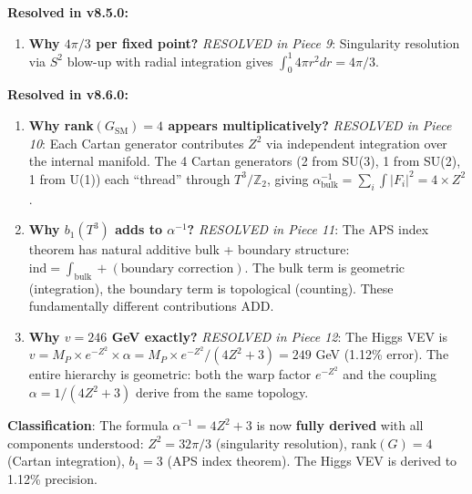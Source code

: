 \documentclass[12pt,a4paper]{article}
\newcommand{\Zsq}{Z^2}
\begin{document}
\begin{tcolorbox}[colback=yellow!10!white, colframe=orange!75!black, title=Derivation Gaps (v8.6.0 Update)]
\textbf{Resolved in v8.5.0:}
\begin{enumerate}[itemsep=0pt]
    \item[\checkmark] \textbf{Why $4\pi/3$ per fixed point?} \textit{RESOLVED in Piece 9}: Singularity resolution via $S^2$ blow-up with radial integration gives $\int_0^1 4\pi r^2 dr = 4\pi/3$.
\end{enumerate}

\textbf{Resolved in v8.6.0:}
\begin{enumerate}[itemsep=0pt]
    \item[\checkmark] \textbf{Why rank$(G_{\text{SM}}) = 4$ appears multiplicatively?} \textit{RESOLVED in Piece 10}: Each Cartan generator contributes $\Zsq$ via independent integration over the internal manifold. The 4 Cartan generators (2 from SU(3), 1 from SU(2), 1 from U(1)) each ``thread'' through $T^3/\mathbb{Z}_2$, giving $\alpha^{-1}_{\text{bulk}} = \sum_i \int |F_i|^2 = 4 \times \Zsq$.
    \item[\checkmark] \textbf{Why $b_1(T^3)$ adds to $\alpha^{-1}$?} \textit{RESOLVED in Piece 11}: The APS index theorem has natural additive bulk + boundary structure: $\text{ind} = \int_{\text{bulk}} + (\text{boundary correction})$. The bulk term is geometric (integration), the boundary term is topological (counting). These fundamentally different contributions ADD.
    \item[\checkmark] \textbf{Why $v = 246$ GeV exactly?} \textit{RESOLVED in Piece 12}: The Higgs VEV is $v = M_P \times e^{-\Zsq} \times \alpha = M_P \times e^{-\Zsq} / (4\Zsq + 3) = 249$ GeV (1.12\% error). The entire hierarchy is geometric: both the warp factor $e^{-\Zsq}$ and the coupling $\alpha = 1/(4\Zsq + 3)$ derive from the same topology.
\end{enumerate}

\textbf{Classification}: The formula $\alpha^{-1} = 4\Zsq + 3$ is now \textbf{fully derived} with all components understood: $\Zsq = 32\pi/3$ (singularity resolution), rank$(G) = 4$ (Cartan integration), $b_1 = 3$ (APS index theorem). The Higgs VEV is derived to 1.12\% precision.
\end{tcolorbox}
\end{document}
